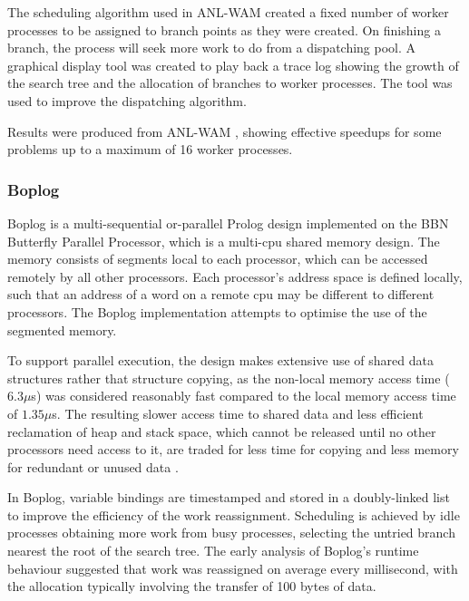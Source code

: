 The scheduling algorithm used in ANL-WAM created a fixed number of worker processes to
be assigned to branch points as they were created.  On finishing a branch, the process will
seek more work to do from a dispatching pool.  A graphical display tool was created to play
back a trace log showing the growth of the search tree and the allocation of branches to
worker processes.  The tool was used to improve the dispatching algorithm.

Results were produced from ANL-WAM \cite{DLO87}, showing effective speedups for some problems
up to a maximum of 16 worker processes.

\subsubsection{Boplog}


Boplog \cite{TL87}  is a multi-sequential or-parallel Prolog design
implemented on the BBN Butterfly Parallel Processor, which is a multi-cpu
shared memory design.  The memory consists of segments local to each processor, which can
be accessed remotely by all other processors.  Each processor's address space is
defined locally, such that an address of a word on a remote cpu may be different to
different processors.  The Boplog
implementation attempts to optimise the use of the segmented memory.

To support parallel execution, the design 
makes extensive use of shared data structures rather that structure copying, as the
non-local memory access time ($6.3 \mu$s) was considered reasonably fast compared to the
local memory access time of $1.35\mu$s.  The resulting slower access time to shared data
and less efficient reclamation of heap and stack space, which cannot be released until no other
processors need access to it, are traded for less time for copying and less memory for
redundant or unused data \cite{TL87}.

In Boplog, variable bindings are timestamped and stored in a doubly-linked list to
improve the efficiency of the work reassignment.  Scheduling is achieved by idle processes
obtaining more work from busy processes, selecting the untried branch nearest the
root of the search tree.  The early analysis of Boplog's runtime behaviour suggested that
work was reassigned on average every millisecond, with the allocation typically involving the
transfer of 100 bytes of data.

